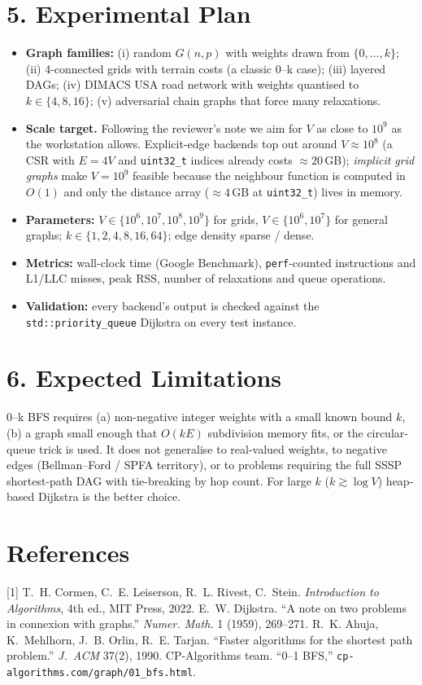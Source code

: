 \documentclass[11pt,a4paper]{article}
\begin{document}
\section*{5. Experimental Plan}
\begin{itemize}[leftmargin=1.4em,itemsep=0.1em,topsep=0.1em]
    \item \textbf{Graph families:} (i) random $G(n,p)$ with weights drawn from
          $\{0,\dots,k\}$; (ii) 4-connected grids with terrain costs (a classic
          0--k case); (iii) layered DAGs; (iv) DIMACS USA road network with
          weights quantised to $k\in\{4,8,16\}$; (v) adversarial chain graphs
          that force many relaxations.
    \item \textbf{Scale target.} Following the reviewer's note we aim for
          $V$ as close to $10^9$ as the workstation allows. Explicit-edge
          backends top out around $V \approx 10^8$ (a CSR with $E=4V$ and
          \texttt{uint32\_t} indices already costs $\approx 20$\,GB);
          \emph{implicit grid graphs} make $V=10^9$ feasible because the
          neighbour function is computed in $O(1)$ and only the distance
          array ($\approx 4$\,GB at \texttt{uint32\_t}) lives in memory.
    \item \textbf{Parameters:} $V \in \{10^6, 10^7, 10^8, 10^9\}$ for grids,
          $V \in \{10^6, 10^7\}$ for general graphs;
          $k \in \{1,2,4,8,16,64\}$; edge density sparse / dense.
    \item \textbf{Metrics:} wall-clock time (Google Benchmark),
          \texttt{perf}-counted instructions and L1/LLC misses, peak RSS,
          number of relaxations and queue operations.
    \item \textbf{Validation:} every backend's output is checked against the
          \texttt{std::priority\_queue} Dijkstra on every test instance.
\end{itemize}

\section*{6. Expected Limitations}
0--k BFS requires (a) non-negative integer weights with a small known bound
$k$, (b) a graph small enough that $O(kE)$ subdivision memory fits, or the
circular-queue trick is used. It does not generalise to real-valued weights,
to negative edges (Bellman--Ford / SPFA territory), or to problems requiring
the full SSSP shortest-path DAG with tie-breaking by hop count. For large
$k$ ($k \gtrsim \log V$) heap-based Dijkstra is the better choice.

\section*{References}
\small
[1] T.~H. Cormen, C.~E. Leiserson, R.~L. Rivest, C.~Stein. \emph{Introduction to Algorithms}, 4th ed., MIT Press, 2022. \quad
[2] E.~W. Dijkstra. ``A note on two problems in connexion with graphs.'' \emph{Numer. Math.} 1 (1959), 269--271. \quad
[3] R.~K. Ahuja, K.~Mehlhorn, J.~B. Orlin, R.~E. Tarjan. ``Faster algorithms for the shortest path problem.'' \emph{J.\ ACM} 37(2), 1990. \quad
[4] CP-Algorithms team. ``0--1 BFS,'' \texttt{cp-algorithms.com/graph/01\_bfs.html}.
\end{document}
